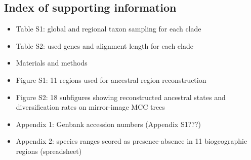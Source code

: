 \subsection{Index of supporting information}

\begin{itemize}
\item Table S1: global and regional taxon sampling for each clade
\item Table S2: used genes and alignment length for each clade
\item Materials and methods
\item Figure S1: 11 regions used for ancestral region reconstruction
\item Figure S2: 18 subfigures showing reconstructed ancestral states and diversification rates on mirror-image MCC trees
\item Appendix 1: Genbank accession numbers (Appendix S1???)
\item Appendix 2: species ranges scored as presence-absence in 11 biogeographic regions (spreadsheet)
\end{itemize}